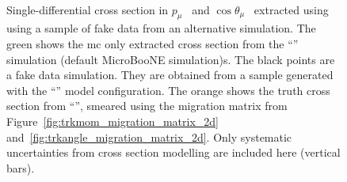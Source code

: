 \begin{figure}[]
\centering
{}
 \\
\caption[Single-Differential Cross Section Extracted with Fake Data]{Single-differential cross section in $p_\mu$~\protect{} and $\cos\theta_\mu$~\protect{} extracted using using a sample of fake data from an alternative simulation. The green shows the \acrshort{mc} only extracted cross section from the ``\tuneone'' simulation (default MicroBooNE simulation)s. The black points are a fake data simulation. They are obtained from a sample generated with the ``\tunethree'' model configuration. The orange shows the truth \g cross section from ``\tunethree'', smeared using the migration matrix from Figure~\ref{fig:trkmom_migration_matrix_2d} and~\ref{fig:trkangle_migration_matrix_2d}. Only systematic uncertainties from cross section modelling are included here (vertical bars).}
\label{fig:xsec_fakedata}
\end{figure}











